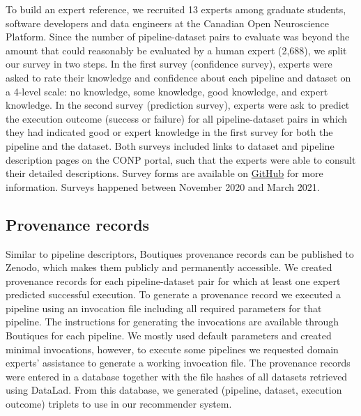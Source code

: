 \documentclass[conference]{IEEEtran}
\begin{document}
To build an expert reference, we recruited 13 experts among graduate
students, software developers and data engineers at the Canadian Open
Neuroscience Platform. Since the number of pipeline-dataset pairs to
evaluate was beyond the amount that could reasonably be evaluated by a
human expert (2,688), we split our survey in two steps. In the first survey
(confidence survey), experts were asked to rate their knowledge and
confidence about each pipeline and dataset on a 4-level scale: no
knowledge, some knowledge, good knowledge, and expert knowledge. In the second
survey (prediction survey), experts were ask to predict the execution
outcome (success or failure) for all pipeline-dataset pairs in which they
had indicated good or expert knowledge in the first survey for both the
pipeline and the dataset. Both surveys included links to dataset and pipeline description pages on the CONP portal, such that the experts were able to consult their detailed descriptions. Survey forms are available on \href{https://github.com/big-data-lab-team/paper-pipelines-datasets-recommender/blob/master/data}{GitHub} for more information. Surveys happened between November 2020 and March 2021.


\subsection{Provenance records} 

Similar to pipeline descriptors, Boutiques provenance records can be
published to Zenodo, which makes them publicly and permanently accessible.
We created provenance records for each pipeline-dataset pair for which at least one expert predicted successful execution. To generate a provenance record we executed a pipeline using an invocation file including all required parameters for that pipeline. The instructions for generating the invocations are available through Boutiques for each pipeline. We mostly used default parameters and created minimal invocations, however, to execute some pipelines we requested domain experts' assistance to generate a working invocation file.
The provenance records were entered in a database together with the file hashes of all datasets retrieved using DataLad. From this database, we generated (pipeline, dataset, execution outcome) triplets to use in our recommender system.



\end{document}
